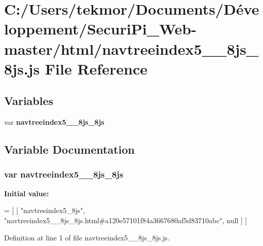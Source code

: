 \section{C\+:/\+Users/tekmor/\+Documents/\+Développement/\+Securi\+Pi\+\_\+\+Web-\/master/html/navtreeindex5\+\_\+\+\_\+8js\+\_\+8js.js File Reference}
\label{navtreeindex5____8js__8js_8js}
\subsection*{Variables}
\begin{DoxyCompactItemize}
\item 
var {\bf navtreeindex5\+\_\+\+\_\+8js\+\_\+8js}
\end{DoxyCompactItemize}


\subsection{Variable Documentation}
\subsubsection[{navtreeindex5\+\_\+\+\_\+8js\+\_\+8js}]{\setlength{\rightskip}{0pt plus 5cm}var navtreeindex5\+\_\+\+\_\+8js\+\_\+8js}\label{navtreeindex5____8js__8js_8js_aae7f3ee82836b3209fb059842fc35c6a}
{\bfseries Initial value\+:}
\begin{DoxyCode}
=
[
    [ \textcolor{stringliteral}{"navtreeindex5\_8js"}, \textcolor{stringliteral}{"navtreeindex5\_\_8js\_8js.html#a120e57101f84a3667680af5d83710abc"}, null ]
]
\end{DoxyCode}


Definition at line 1 of file navtreeindex5\+\_\+\+\_\+8js\+\_\+8js.\+js.

